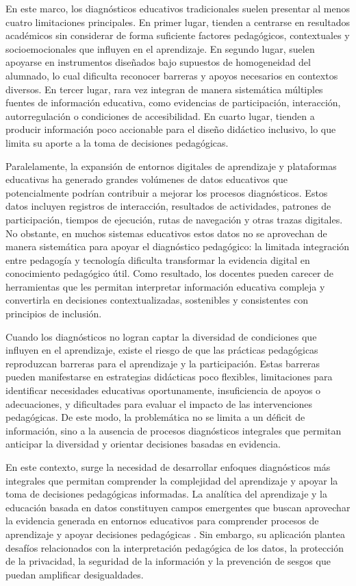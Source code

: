 \begin{refsection}
En este marco, los diagnósticos educativos tradicionales suelen presentar al menos cuatro limitaciones principales. En primer lugar, tienden a centrarse en resultados académicos sin considerar de forma suficiente factores pedagógicos, contextuales y socioemocionales que influyen en el aprendizaje. En segundo lugar, suelen apoyarse en instrumentos diseñados bajo supuestos de homogeneidad del alumnado, lo cual dificulta reconocer barreras y apoyos necesarios en contextos diversos. En tercer lugar, rara vez integran de manera sistemática múltiples fuentes de información educativa, como evidencias de participación, interacción, autorregulación o condiciones de accesibilidad. En cuarto lugar, tienden a producir información poco accionable para el diseño didáctico inclusivo, lo que limita su aporte a la toma de decisiones pedagógicas.

Paralelamente, la expansión de entornos digitales de aprendizaje y plataformas educativas ha generado grandes volúmenes de datos educativos que potencialmente podrían contribuir a mejorar los procesos diagnósticos. Estos datos incluyen registros de interacción, resultados de actividades, patrones de participación, tiempos de ejecución, rutas de navegación y otras trazas digitales. No obstante, en muchos sistemas educativos estos datos no se aprovechan de manera sistemática para apoyar el diagnóstico pedagógico: la limitada integración entre pedagogía y tecnología dificulta transformar la evidencia digital en conocimiento pedagógico útil. Como resultado, los docentes pueden carecer de herramientas que les permitan interpretar información educativa compleja y convertirla en decisiones contextualizadas, sostenibles y consistentes con principios de inclusión.

Cuando los diagnósticos no logran captar la diversidad de condiciones que influyen en el aprendizaje, existe el riesgo de que las prácticas pedagógicas reproduzcan barreras para el aprendizaje y la participación. Estas barreras pueden manifestarse en estrategias didácticas poco flexibles, limitaciones para identificar necesidades educativas oportunamente, insuficiencia de apoyos o adecuaciones, y dificultades para evaluar el impacto de las intervenciones pedagógicas. De este modo, la problemática no se limita a un déficit de información, sino a la ausencia de procesos diagnósticos integrales que permitan anticipar la diversidad y orientar decisiones basadas en evidencia.

En este contexto, surge la necesidad de desarrollar enfoques diagnósticos más integrales que permitan comprender la complejidad del aprendizaje y apoyar la toma de decisiones pedagógicas informadas. La analítica del aprendizaje y la educación basada en datos constituyen campos emergentes que buscan aprovechar la evidencia generada en entornos educativos para comprender procesos de aprendizaje y apoyar decisiones pedagógicas \parencite{siemenslong2011}. Sin embargo, su aplicación plantea desafíos relacionados con la interpretación pedagógica de los datos, la protección de la privacidad, la seguridad de la información y la prevención de sesgos que puedan amplificar desigualdades.


\end{refsection}
